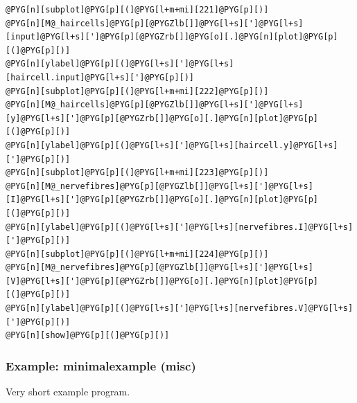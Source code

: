 \documentclass[letterpaper,10pt,english]{manual}
\begin{document}
\begin{Verbatim}[commandchars=@\[\]]
@PYG[n][subplot]@PYG[p][(]@PYG[l+m+mi][221]@PYG[p][)]
@PYG[n][M@_haircells]@PYG[p][@PYGZlb[]]@PYG[l+s][']@PYG[l+s][input]@PYG[l+s][']@PYG[p][@PYGZrb[]]@PYG[o][.]@PYG[n][plot]@PYG[p][(]@PYG[p][)]
@PYG[n][ylabel]@PYG[p][(]@PYG[l+s][']@PYG[l+s][haircell.input]@PYG[l+s][']@PYG[p][)]
@PYG[n][subplot]@PYG[p][(]@PYG[l+m+mi][222]@PYG[p][)]
@PYG[n][M@_haircells]@PYG[p][@PYGZlb[]]@PYG[l+s][']@PYG[l+s][y]@PYG[l+s][']@PYG[p][@PYGZrb[]]@PYG[o][.]@PYG[n][plot]@PYG[p][(]@PYG[p][)]
@PYG[n][ylabel]@PYG[p][(]@PYG[l+s][']@PYG[l+s][haircell.y]@PYG[l+s][']@PYG[p][)]
@PYG[n][subplot]@PYG[p][(]@PYG[l+m+mi][223]@PYG[p][)]
@PYG[n][M@_nervefibres]@PYG[p][@PYGZlb[]]@PYG[l+s][']@PYG[l+s][I]@PYG[l+s][']@PYG[p][@PYGZrb[]]@PYG[o][.]@PYG[n][plot]@PYG[p][(]@PYG[p][)]
@PYG[n][ylabel]@PYG[p][(]@PYG[l+s][']@PYG[l+s][nervefibres.I]@PYG[l+s][']@PYG[p][)]
@PYG[n][subplot]@PYG[p][(]@PYG[l+m+mi][224]@PYG[p][)]
@PYG[n][M@_nervefibres]@PYG[p][@PYGZlb[]]@PYG[l+s][']@PYG[l+s][V]@PYG[l+s][']@PYG[p][@PYGZrb[]]@PYG[o][.]@PYG[n][plot]@PYG[p][(]@PYG[p][)]
@PYG[n][ylabel]@PYG[p][(]@PYG[l+s][']@PYG[l+s][nervefibres.V]@PYG[l+s][']@PYG[p][)]
@PYG[n][show]@PYG[p][(]@PYG[p][)]
\end{Verbatim}

\resetcurrentobjects
\hypertarget{--doc-examples-misc_minimalexample}{}

\hypertarget{index-51}{}\subsubsection{Example: minimalexample (misc)}

Very short example program.
\end{document}
